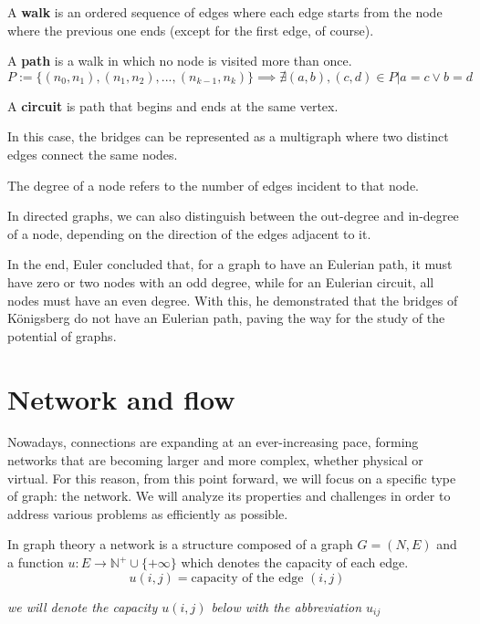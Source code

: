 \begin{definition}
    A \textbf{walk} is an ordered sequence of edges where each edge starts from the node where the previous one ends (except for the first edge, of course).

    A \textbf{path} is a walk in which no node is visited more than once.
    \[P := \{(n_0, n_1),(n_1, n_2), ..., (n_{k-1}, n_k) \}\implies \nexists (a,b), (c,d)\in P | a = c \lor b = d\]
    
    A \textbf{circuit} is path that begins and ends at the same vertex.

\end{definition}

    In this case, the bridges can be represented as a multigraph where two distinct edges connect the same nodes.

\begin{definition}
    The degree of a node refers to the number of edges incident to that node.  
    
    In directed graphs, we can also distinguish between the out-degree and in-degree of a node, depending on the direction of the edges adjacent to it.
\end{definition}

In the end, Euler concluded that, for a graph to have an Eulerian path, it must have zero or two nodes with an odd degree, while for an Eulerian circuit, all nodes must have an even degree. With this, he demonstrated that the bridges of Königsberg do not have an Eulerian path, paving the way for the study of the potential of graphs.
\newpage
\section{Network and flow}
Nowadays, connections are expanding at an ever-increasing pace, forming networks that are becoming larger and more complex, whether physical or virtual. For this reason, from this point forward, we will focus on a specific type of graph: the network. We will analyze its properties and challenges in order to address various problems as efficiently as possible.
\begin{definition}[Network]
    In graph theory a network is a structure composed of a graph $G = (N,E)$ and a function $u: E \rightarrow \mathbb{N}^+\cup \{+\infty\}$ which denotes the capacity of each edge.
    \[u(i,j) = \text{capacity of the edge } (i,j)\]
    \begin{center}
        \textit{we will denote the capacity $u(i,j)$ below with the abbreviation $u_{ij}$}
    \end{center}
\end{definition}

